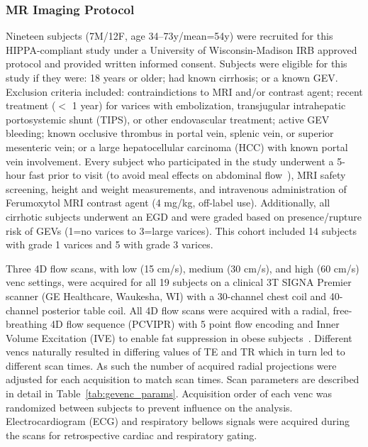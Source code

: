 \subsubsection{MR Imaging Protocol}
Nineteen subjects (7M/12F, age 34--73y/mean=54y) were recruited for this HIPPA-compliant study under a University of Wisconsin-Madison IRB approved protocol and provided written informed consent. Subjects were eligible for this study if they were: 18 years or older; had known cirrhosis; or a known GEV\@. Exclusion criteria included: contraindictions to MRI and/or contrast agent; recent treatment ($<$ 1 year) for varices with embolization, transjugular intrahepatic portosystemic shunt (TIPS), or other endovascular treatment; active GEV bleeding; known occlusive thrombus in portal vein, splenic vein, or superior mesenteric vein; or a large hepatocellular carcinoma (HCC) with known portal vein involvement. Every subject who participated in the study underwent a 5-hour fast prior to visit (to avoid meal effects on abdominal flow~\cite{roldan-alzateCharacterizationMesentericPortal2022, roldan-alzateImpairedRegulationPortal2015}), MRI safety screening, height and weight measurements, and intravenous administration of Ferumoxytol MRI contrast agent (4 mg/kg, off-label use)\cite{vasanawalaSafetyTechniqueFerumoxytol2016}. Additionally, all cirrhotic subjects underwent an EGD and were graded based on presence/rupture risk of GEVs (1=no varices to 3=large varices). This cohort included 14 subjects with grade 1 varices and 5 with grade 3 varices. 

Three 4D flow scans, with low (15 cm/s), medium (30 cm/s), and high (60 cm/s) venc settings, were acquired for all 19 subjects on a clinical 3T SIGNA Premier scanner (GE Healthcare, Waukesha, WI) with a 30-channel chest coil and 40-channel posterior table coil. All 4D flow scans were acquired with a radial, free-breathing 4D flow sequence (PCVIPR) with 5 point flow encoding and Inner Volume Excitation (IVE) to enable fat suppression in obese subjects~\cite{johnsonImproved3DPhase2008,johnsonImprovedSNRPhase2010, shamimFatMitigationStrategies2023}. Different vencs naturally resulted in differing values of TE and TR which in turn led to different scan times. As such the number of acquired radial projections were adjusted for each acquisition to match scan times. Scan parameters are described in detail in Table~\ref{tab:gevenc_params}. Acquisition order of each venc was randomized between subjects to prevent influence on the analysis. Electrocardiogram (ECG) and respiratory bellows signals were acquired during the scans for retrospective cardiac and respiratory gating. 

